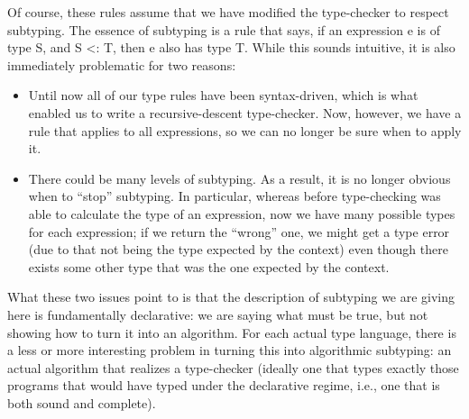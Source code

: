 Of course, these rules assume that we have modified the type-checker to respect
subtyping. The essence of subtyping is a rule that says, if an expression e is
of type S, and S <: T, then e also has type T. While this sounds intuitive, it
is also immediately problematic for two reasons:
\begin{itemize}
  \item 
Until now all of our type rules have been syntax-driven, which is what enabled
us to write a recursive-descent type-checker. Now, however, we have a rule that
applies to all expressions, so we can no longer be sure when to apply it.
  \item 
There could be many levels of subtyping. As a result, it is no longer obvious
when to “stop” subtyping. In particular, whereas before type-checking was able
to calculate the type of an expression, now we have many possible types for each
expression; if we return the “wrong” one, we might get a type error (due to that
not being the type expected by the context) even though there exists some other
type that was the one expected by the context.
\end{itemize}
What these two issues point to is that the description of subtyping we are
giving here is fundamentally declarative: we are saying what must be true, but
not showing how to turn it into an algorithm. For each actual type language,
there is a less or more interesting problem in turning this into algorithmic
subtyping: an actual algorithm that realizes a type-checker (ideally one that
types exactly those programs that would have typed under the declarative regime,
i.e., one that is both sound and complete).

\secup